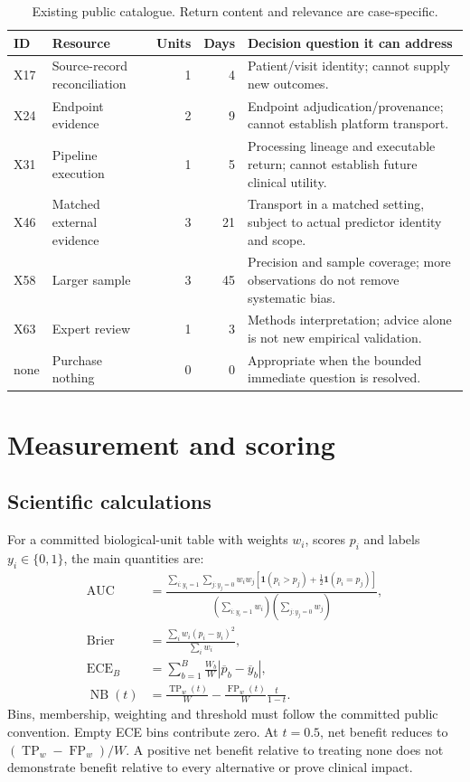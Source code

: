 \documentclass[11pt,a4paper]{article}
\begin{document}
\begin{table}[H]\small
\begin{tabularx}{\textwidth}{@{}lYrrY@{}}\toprule
ID & Resource & Units & Days & Decision question it can address \\\midrule
X17 & Source-record reconciliation & 1 & 4 & Patient/visit identity; cannot supply new outcomes. \\
X24 & Endpoint evidence & 2 & 9 & Endpoint adjudication/provenance; cannot establish platform transport. \\
X31 & Pipeline execution & 1 & 5 & Processing lineage and executable return; cannot establish future clinical utility. \\
X46 & Matched external evidence & 3 & 21 & Transport in a matched setting, subject to actual predictor identity and scope. \\
X58 & Larger sample & 3 & 45 & Precision and sample coverage; more observations do not remove systematic bias. \\
X63 & Expert review & 1 & 3 & Methods interpretation; advice alone is not new empirical validation. \\
none & Purchase nothing & 0 & 0 & Appropriate when the bounded immediate question is resolved. \\\bottomrule
\end{tabularx}
\caption{Existing public catalogue. Return content and relevance are case-specific.}
\end{table}

\section{Measurement and scoring}
\subsection{Scientific calculations}

For a committed biological-unit table with weights $w_i$, scores $p_i$ and labels $y_i\in\{0,1\}$, the main quantities are:
\begin{align}
\operatorname{AUC}&=\frac{\sum_{i:y_i=1}\sum_{j:y_j=0}w_iw_j
 [\mathbf{1}(p_i>p_j)+\tfrac12\mathbf{1}(p_i=p_j)]}
 {\left(\sum_{i:y_i=1}w_i\right)\left(\sum_{j:y_j=0}w_j\right)},\\
\operatorname{Brier}&=\frac{\sum_i w_i(p_i-y_i)^2}{\sum_i w_i},\\
\operatorname{ECE}_{B}&=\sum_{b=1}^{B}\frac{W_b}{W}
 \left|\overline{p}_b-\overline{y}_b\right|,\\
\operatorname{NB}(t)&=\frac{\operatorname{TP}_w(t)}{W}
 -\frac{\operatorname{FP}_w(t)}{W}\frac{t}{1-t}.
\end{align}
Bins, membership, weighting and threshold must follow the committed public convention. Empty ECE bins contribute zero. At $t=0.5$, net benefit reduces to $(\operatorname{TP}_w-\operatorname{FP}_w)/W$. A positive net benefit relative to treating none does not demonstrate benefit relative to every alternative or prove clinical impact.
\end{document}
